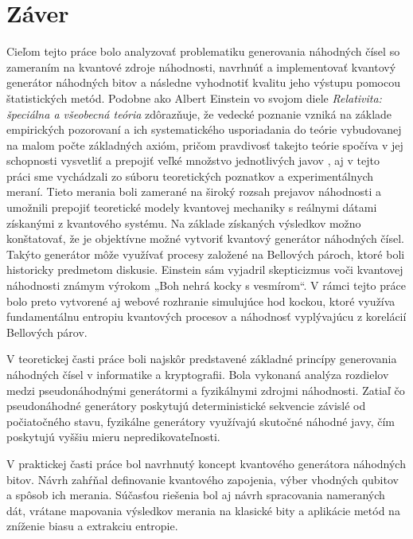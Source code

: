 
\chapter{Záver}\label{ch:summary}

Cieľom tejto práce bolo analyzovať problematiku generovania náhodných čísel so zameraním na kvantové zdroje náhodnosti,
navrhnúť a implementovať kvantový generátor náhodných bitov a následne vyhodnotiť kvalitu jeho výstupu pomocou štatistických metód.
Podobne ako Albert Einstein vo svojom diele \textit{Relativita: špeciálna a všeobecná teória} zdôrazňuje, že vedecké poznanie vzniká na
základe empirických pozorovaní a ich systematického usporiadania do teórie vybudovanej na malom počte základných axióm, pričom pravdivosť
takejto teórie spočíva v jej schopnosti vysvetliť a prepojiť veľké množstvo jednotlivých javov \cite{einsteinRelativity},
aj v tejto práci sme vychádzali zo súboru teoretických poznatkov a experimentálnych meraní.
Tieto merania boli zamerané na široký rozsah prejavov náhodnosti a umožnili prepojiť teoretické modely kvantovej mechaniky s reálnymi dátami získanými z kvantového systému.
Na základe získaných výsledkov možno konštatovať, že je objektívne možné vytvoriť kvantový generátor náhodných čísel.
Takýto generátor môže využívať procesy založené na Bellových pároch, ktoré boli historicky predmetom diskusie.
Einstein sám vyjadril skepticizmus voči kvantovej náhodnosti známym výrokom „Boh nehrá kocky s vesmírom“.
V rámci tejto práce bolo preto vytvorené aj webové rozhranie simulujúce hod kockou,
ktoré využíva fundamentálnu entropiu kvantových procesov a náhodnosť vyplývajúcu z korelácií Bellových párov.

V teoretickej časti práce boli najskôr predstavené základné princípy generovania náhodných čísel v informatike a kryptografii.
Bola vykonaná analýza rozdielov medzi pseudonáhodnými generátormi a fyzikálnymi zdrojmi náhodnosti.
Zatiaľ čo pseudonáhodné generátory poskytujú deterministické sekvencie závislé od počiatočného stavu,
fyzikálne generátory využívajú skutočné náhodné javy, čím poskytujú vyššiu mieru nepredikovateľnosti.

V praktickej časti práce bol navrhnutý koncept kvantového generátora náhodných bitov.
Návrh zahŕňal definovanie kvantového zapojenia, výber vhodných qubitov a spôsob ich merania.
Súčasťou riešenia bol aj návrh spracovania nameraných dát, vrátane mapovania výsledkov merania na klasické bity a aplikácie metód na zníženie biasu a extrakciu entropie.


